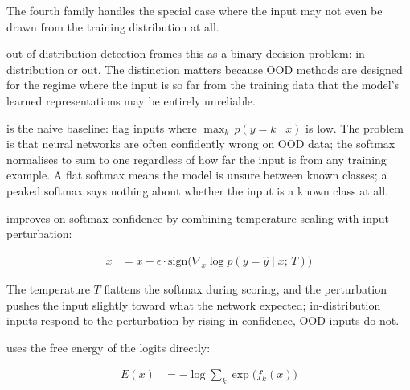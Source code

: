\vspace{2.5em}
The fourth family handles the special case where the input may not even be drawn from the training distribution at all.


 out-of-distribution detection frames this as a binary decision problem: in-distribution or out.
The distinction matters because OOD methods are designed for the regime where the input is so far from the training data that the model's learned representations may be entirely unreliable.

 is the naive baseline: flag inputs where $\max_k\, p(y{=}k \mid x)$ is low.
The problem is that neural networks are often confidently wrong on OOD data; the softmax normalises to sum to one regardless of how far the input is from any training example.
A flat softmax means the model is unsure between known classes; a peaked softmax says nothing about whether the input is a known class at all.

\cite{LiangODIN2018} improves on softmax confidence by combining temperature scaling with input perturbation:

\begin{align*}
    \tilde{x} &= x - \epsilon \cdot \mathrm{sign}\!\bigl(\nabla_x \log p(y{=}\hat{y} \mid x;\, T)\bigr)
\end{align*}

The temperature $T$ flattens the softmax during scoring, and the perturbation pushes the input slightly toward what the network expected; in-distribution inputs respond to the perturbation by rising in confidence, OOD inputs do not.

\cite{LiuEnergy2020} uses the free energy of the logits directly:

\begin{align*}
    E(x) &= -\log \sum_k \exp\!\bigl(f_k(x)\bigr)
\end{align*}

